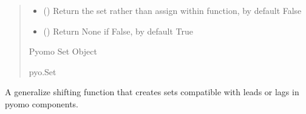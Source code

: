 \documentclass[letterpaper,10pt,english]{sphinxmanual}
\begin{document}
\begin{fulllineitems}
\begin{fulllineitems}
\begin{quote}
\begin{description}
\begin{itemize}
\item {} 
\sphinxAtStartPar
{} (\sphinxstyleliteralemphasis{\sphinxupquote{ | }}\sphinxstyleliteralemphasis{\sphinxupquote{, }}) \textendash{} Return the set rather than assign within function, by default False

\item {} 
\sphinxAtStartPar
{} (\sphinxstyleliteralemphasis{\sphinxupquote{ | }}\sphinxstyleliteralemphasis{\sphinxupquote{, }}) \textendash{} Return None if False, by default True

\end{itemize}

\sphinxAtStartPar
Pyomo Set Object

\sphinxAtStartPar
pyo.Set

\end{description}\end{quote}

\end{fulllineitems}


\begin{fulllineitems}
\label{\detokenize{src.common.model:src.common.model.Model.declare_shifted_time_set}}
\pysigstartsignatures
\pysiglinewithargsret
{}
{\sphinxparamcomma {}\sphinxparamcomma {}\sphinxparamcomma {}\sphinxparamcomma {}\sphinxparamcomma {}}
{}
\pysigstopsignatures
\sphinxAtStartPar
A generalize shifting function that creates sets compatible with leads or lags in pyomo
components.


\end{fulllineitems}
\end{fulllineitems}
\end{document}

